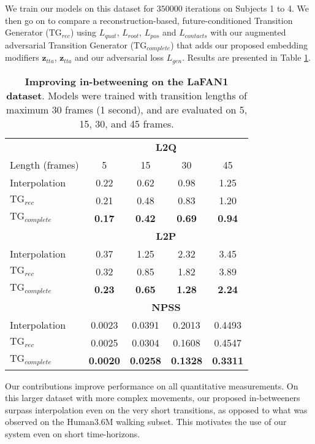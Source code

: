 \documentclass[acmtog]{acmart}
\newcommand{\bz}{\textbf{z}}
\begin{document}
We train our models on this dataset for $\num{350000}$ iterations on Subjects 1 to 4. We then go on to compare a reconstruction-based, future-conditioned Transition Generator ($\mathrm{TG}_{\mathit{rec}}$) using $L_{\mathit{quat}}$, $L_{\mathit{root}}$, $L_{\mathit{pos}}$ and $L_{\mathit{contacts}}$ with our augmented adversarial Transition Generator ($\mathrm{TG}_{\mathit{complete}}$) that adds our proposed embedding modifiers $\bz_{\mathit{tta}}$, $\bz_{\mathit{tta}}$ and our adversarial loss $L_{\mathit{gen}}$. Results are presented in Table \ref{table:lafanres}.
\begin{table}[h]
    \centering
    \caption{\textbf{Improving in-betweening on the LaFAN1 dataset}. Models were trained with transition lengths of maximum 30 frames (1 second), and are evaluated on 5, 15, 30, and 45 frames.}
    \small
\begin{tabular}{lccc|c}
        
        &\multicolumn{4}{c}{\textbf{L2Q}}\\
        \cmidrule(r){2-5}
        Length (frames) &5&15&30&45 \\
        \midrule 
        Interpolation           & 0.22 &0.62  &0.98 &1.25\\
$\mathrm{TG}_{\mathit{rec}}$ & 0.21 &0.48  &0.83 &1.20\\
        $\mathrm{TG}_{\mathit{complete}}$  & \textbf{0.17}	&\textbf{0.42} &\textbf{0.69}	&\textbf{0.94}\\
        &\multicolumn{4}{c}{\textbf{L2P}}\\
        \cmidrule(r){2-5}
        Interpolation           &0.37 &1.25 &2.32 &3.45\\
$\mathrm{TG}_{\mathit{rec}}$ & 0.32 &0.85  &1.82 &3.89\\
        $\mathrm{TG}_{\mathit{complete}}$   &\textbf{0.23} &\textbf{0.65} &\textbf{1.28} &\textbf{2.24}\\
        &\multicolumn{4}{c}{\textbf{NPSS}}\\
        \cmidrule(r){2-5}
        Interpolation               &0.0023 &0.0391 &0.2013 &0.4493\\
$\mathrm{TG}_{\mathit{rec}}$     & 0.0025 &0.0304  &0.1608 &0.4547\\
        $\mathrm{TG}_{\mathit{complete}}$   &\textbf{0.0020}	&\textbf{0.0258} &\textbf{0.1328} &\textbf{0.3311}\\
\end{tabular}
    \label{table:lafanres}
\end{table} 
Our contributions improve performance on all quantitative measurements. On this larger dataset with more complex movements, our proposed in-betweeners surpass interpolation even on the very short transitions, as opposed to what was observed on the Human3.6M walking subset. This motivates the use of our system even on short time-horizons. 
\end{document}
